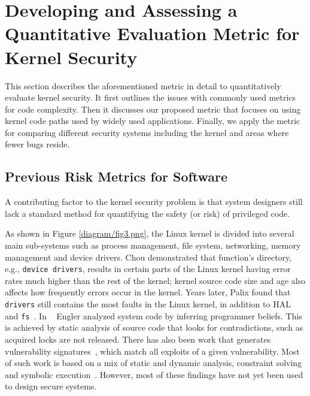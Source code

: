 \section{Developing and Assessing a Quantitative Evaluation Metric for
Kernel Security}
\label{sec.metric}
 
This section describes the aforementioned metric in detail to 
quantitatively evaluate kernel security. It first outlines the issues with
commonly used metrics for code complexity. Then it discusses our proposed metric that
focuses on using kernel code paths used by %
widely used applications. Finally, we
apply the metric %
for comparing different security systems including the kernel and areas where fewer bugs reside.

\subsection{Previous Risk Metrics for Software}

A contributing factor to the kernel security problem is that system
designers 
still lack a standard method for quantifying the safety (or risk) of
privileged code.   


As shown in Figure \ref{diagram/fig3.png}, the Linux kernel is divided into several main sub-systems such as %
process management, file system, networking, memory management and device drivers.
Chou %
\cite{PittSFIeld} demonstrated that function's directory, e.g., 
\texttt{device drivers}, results in certain parts of the Linux kernel having error rates much 
higher than the rest of the kernel; kernel source code size and age also affects
how frequently errors occur in the kernel.
Years later, Palix found that \texttt{drivers} still contains the most faults in 
the Linux kernel, in addition to HAL and \texttt{fs}~\cite{palix2011faults}. 
In ~\cite{engler2001bugs} Engler analyzed system code by inferring programmer 
beliefs. This is achieved by static analysis
of source code that looks for contradictions, such as acquired locks are 
not released. There has also been work that generates vulnerability 
signatures~\cite{brumley2006towards}, which match all exploits
of a given vulnerability. Most of such work is based on a mix of static and
dynamic analysis, constraint solving and symbolic execution~\cite{chou2003static}.
However, most of these findings have not yet been used to design 
secure systems. 

